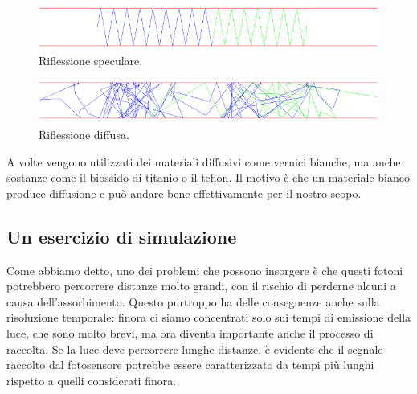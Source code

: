 \begin{figure}[H]
   \centering
   \includegraphics[width=\textwidth]{immagini/riflessione_speculare.png}
   \caption*{Riflessione speculare.}
\end{figure}
\begin{figure}[H]
   \centering
   \includegraphics[width=\textwidth]{immagini/riflessione_diffusa.png}
   \caption*{Riflessione diffusa.}
\end{figure}

A volte vengono utilizzati dei materiali diffusivi come vernici bianche, ma anche sostanze come il biossido di titanio o il teflon. Il motivo è che un materiale bianco produce diffusione e può andare bene effettivamente per il nostro scopo. 

\subsection{Un esercizio di simulazione}

Come abbiamo detto, uno dei problemi che possono insorgere è che questi fotoni potrebbero percorrere distanze molto grandi, con il rischio di perderne alcuni a causa dell'assorbimento. Questo purtroppo ha delle conseguenze anche sulla risoluzione temporale: finora ci siamo concentrati solo sui tempi di emissione della luce, che sono molto brevi, ma ora diventa importante anche il processo di raccolta. Se la luce deve percorrere lunghe distanze, è evidente che il segnale raccolto dal fotosensore potrebbe essere caratterizzato da tempi più lunghi rispetto a quelli considerati finora.

